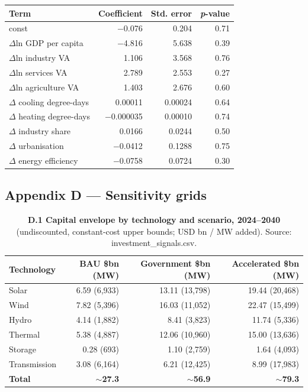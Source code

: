 \documentclass[10pt,twocolumn]{article}
\begin{document}
\begin{table}[tp]
\centering
\renewcommand{\arraystretch}{1.18}\small
\begin{tabularx}{\textwidth}{Lrrr}
\toprule
\textbf{Term} & \textbf{Coefficient} & \textbf{Std. error} & \textbf{\textit{p}-value} \\
\midrule
const & $-$0.076 & 0.204 & 0.71 \\
$\Delta$ln GDP per capita & $-$4.816 & 5.638 & 0.39 \\
$\Delta$ln industry VA & 1.106 & 3.568 & 0.76 \\
$\Delta$ln services VA & 2.789 & 2.553 & 0.27 \\
$\Delta$ln agriculture VA & 1.403 & 2.676 & 0.60 \\
$\Delta$ cooling degree-days & 0.00011 & 0.00024 & 0.64 \\
$\Delta$ heating degree-days & $-$0.000035 & 0.00010 & 0.74 \\
$\Delta$ industry share & 0.0166 & 0.0244 & 0.50 \\
$\Delta$ urbanisation & $-$0.0412 & 0.1288 & 0.75 \\
$\Delta$ energy efficiency & $-$0.0758 & 0.0724 & 0.30 \\
\bottomrule
\end{tabularx}
\par{}
\end{table}

\subsection*{Appendix D --- Sensitivity grids}

\begin{table}[tp]
\centering
\caption*{\textbf{D.1 Capital envelope by technology and scenario, 2024--2040} (undiscounted, constant-cost upper bounds; USD bn / MW added). Source: investment\_signals.csv.}
\renewcommand{\arraystretch}{1.18}\small
\begin{tabularx}{\textwidth}{Lrrr}
\toprule
\textbf{Technology} & \textbf{BAU \$bn (MW)} & \textbf{Government \$bn (MW)} & \textbf{Accelerated \$bn (MW)} \\
\midrule
Solar & 6.59 (6,933) & 13.11 (13,798) & 19.44 (20,468) \\
Wind & 7.82 (5,396) & 16.03 (11,052) & 22.47 (15,499) \\
Hydro & 4.14 (1,882) & 8.41 (3,823) & 11.74 (5,336) \\
Thermal & 5.38 (4,887) & 12.06 (10,960) & 15.00 (13,636) \\
Storage & 0.28 (693) & 1.10 (2,759) & 1.64 (4,093) \\
Transmission & 3.08 (6,164) & 6.21 (12,425) & 8.99 (17,983) \\
\textbf{Total} & \textbf{$\sim$27.3} & \textbf{$\sim$56.9} & \textbf{$\sim$79.3} \\
\bottomrule
\end{tabularx}
\end{table}
\end{document}
